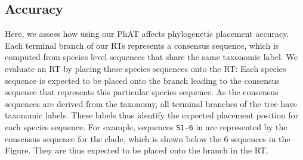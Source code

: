 \subsection{Accuracy}
\label{ch:AutomaticTrees:sec:Evaluation:sub:Accuracy}

Here, we assess how using our \ac{PhAT} affects phylogenetic placement accuracy.
Each terminal branch of our \acp{RT} represents a consensus sequence,
which is computed from species level sequences %
that share the same taxonomic label.
We evaluate an \ac{RT} by placing these species sequences onto the \ac{RT}:
Each species sequence is expected to be placed onto the branch
leading to the consensus sequence that represents this particular species sequence.
As the consensus sequences are derived from the taxonomy, all terminal branches of the tree have taxonomic labels.
These labels thus identify the expected placement position for each species sequence.
For example, sequences \texttt{S1-6} in 
are represented by the consensus sequence for the  clade,
which is shown below the \num{6} sequences in the Figure.
They are thus expected to be placed onto the  branch in the \ac{RT}.


